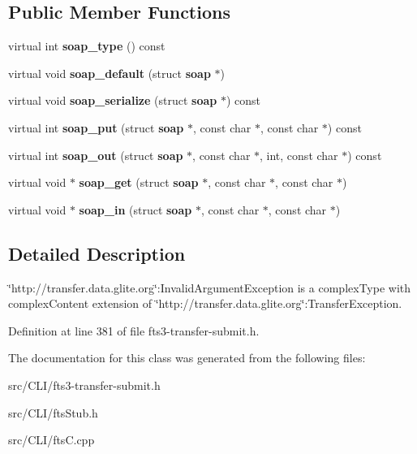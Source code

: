 \subsection*{Public Member Functions}
\begin{DoxyCompactItemize}
\item 
virtual int {\bfseries soap\_\-type} () const \label{classtransfer____InvalidArgumentException_af13c682aa8ac06c0d7a7159d69ce4466}

\item 
virtual void {\bfseries soap\_\-default} (struct {\bf soap} $\ast$)\label{classtransfer____InvalidArgumentException_a471166c8b37d36c458bd0a4b8f770953}

\item 
virtual void {\bfseries soap\_\-serialize} (struct {\bf soap} $\ast$) const \label{classtransfer____InvalidArgumentException_a0bfedaac6062e26620f2630a8c004845}

\item 
virtual int {\bfseries soap\_\-put} (struct {\bf soap} $\ast$, const char $\ast$, const char $\ast$) const \label{classtransfer____InvalidArgumentException_a30752da402add21fc7d592c8e276a82e}

\item 
virtual int {\bfseries soap\_\-out} (struct {\bf soap} $\ast$, const char $\ast$, int, const char $\ast$) const \label{classtransfer____InvalidArgumentException_a62a1cae6327c51207ee37575ca2b579d}

\item 
virtual void $\ast$ {\bfseries soap\_\-get} (struct {\bf soap} $\ast$, const char $\ast$, const char $\ast$)\label{classtransfer____InvalidArgumentException_a621dc17c143b729f6446a1e88ac9b0b1}

\item 
virtual void $\ast$ {\bfseries soap\_\-in} (struct {\bf soap} $\ast$, const char $\ast$, const char $\ast$)\label{classtransfer____InvalidArgumentException_aae6ee95918d3784d35cda75b5c70d954}

\end{DoxyCompactItemize}


\subsection{Detailed Description}
\char`\"{}http://transfer.data.glite.org\char`\"{}:InvalidArgumentException is a complexType with complexContent extension of \char`\"{}http://transfer.data.glite.org\char`\"{}:TransferException. 

Definition at line 381 of file fts3-\/transfer-\/submit.h.



The documentation for this class was generated from the following files:\begin{DoxyCompactItemize}
\item 
src/CLI/fts3-\/transfer-\/submit.h\item 
src/CLI/ftsStub.h\item 
src/CLI/ftsC.cpp\end{DoxyCompactItemize}
